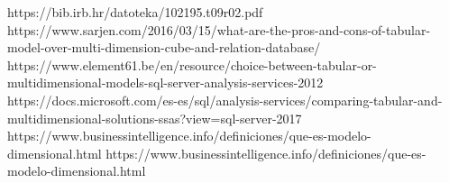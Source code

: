 \documentclass[preprint,12pt]{elsarticle}
\begin{document}
	
	

	
	\newpage
	
	   \begin{thebibliography}{0}
               https://bib.irb.hr/datoteka/102195.t09r02.pdf 
                  https://www.sarjen.com/2016/03/15/what-are-the-pros-and-cons-of-tabular-model-over-multi-dimension-cube-and-relation-database/
                  https://www.element61.be/en/resource/choice-between-tabular-or-multidimensional-models-sql-server-analysis-services-2012
                   https://docs.microsoft.com/es-es/sql/analysis-services/comparing-tabular-and-multidimensional-solutions-ssas?view=sql-server-2017
  https://www.businessintelligence.info/definiciones/que-es-modelo-dimensional.html
                     https://www.businessintelligence.info/definiciones/que-es-modelo-dimensional.html


         \end{thebibliography}
	
\end{document}
